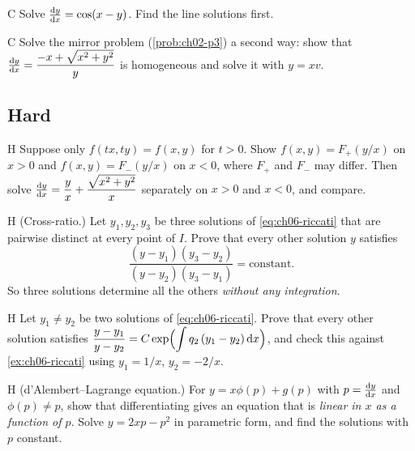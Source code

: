 \begin{problem}{C}\label{prob:ch06-c7}
Solve $\frac{\mathrm{d}y}{\mathrm{d}x} = \cos(x - y)$. Find the line solutions first.
\end{problem}

\begin{problem}{C}\label{prob:ch06-c8}
Solve the mirror problem (\cref{prob:ch02-p3}) a second way: show that
$\frac{\mathrm{d}y}{\mathrm{d}x} = \dfrac{-x + \sqrt{x^2+y^2}}{y}$ is homogeneous and solve it with
$y = xv$.
\end{problem}

\subsection*{Hard}

\begin{problem}{H}\label{prob:ch06-h1}
Suppose only $f(tx,ty) = f(x,y)$ for $t>0$. Show $f(x,y) = F_+(y/x)$ on
$x>0$ and $f(x,y) = F_-(y/x)$ on $x<0$, where $F_+$ and $F_-$ may differ. Then
solve $\frac{\mathrm{d}y}{\mathrm{d}x} = \dfrac yx + \dfrac{\sqrt{x^2+y^2}}{x}$ separately on $x>0$
and $x<0$, and compare.
\end{problem}

\begin{problem}{H}\label{prob:ch06-h2}
(Cross-ratio.) Let $y_1, y_2, y_3$ be three solutions of \eqref{eq:ch06-riccati}
that are pairwise distinct at every point of $I$. Prove that every other
solution $y$ satisfies
\[
  \frac{(y - y_1)(y_3 - y_2)}{(y - y_2)(y_3 - y_1)} = \text{constant}.
\]
So three solutions determine all the others \emph{without any integration}.
\end{problem}

\begin{problem}{H}\label{prob:ch06-h3}
Let $y_1\neq y_2$ be two solutions of \eqref{eq:ch06-riccati}. Prove that every
other solution satisfies
$\dfrac{y - y_1}{y - y_2} = C\exp\Bigl(\displaystyle\int q_2\,(y_1 - y_2)\,\mathrm{d}x\Bigr)$,
and check this against \cref{ex:ch06-riccati} using $y_1 = 1/x$, $y_2 = -2/x$.
\end{problem}

\begin{problem}{H}\label{prob:ch06-h4}
(d'Alembert--Lagrange equation.) For $y = x\phi(p) + g(p)$ with
$p = \frac{\mathrm{d}y}{\mathrm{d}x}$ and $\phi(p)\neq p$, show that differentiating gives an
equation that is \emph{linear in $x$ as a function of $p$}. Solve
$y = 2xp - p^2$ in parametric form, and find the solutions with $p$ constant.
\end{problem}

